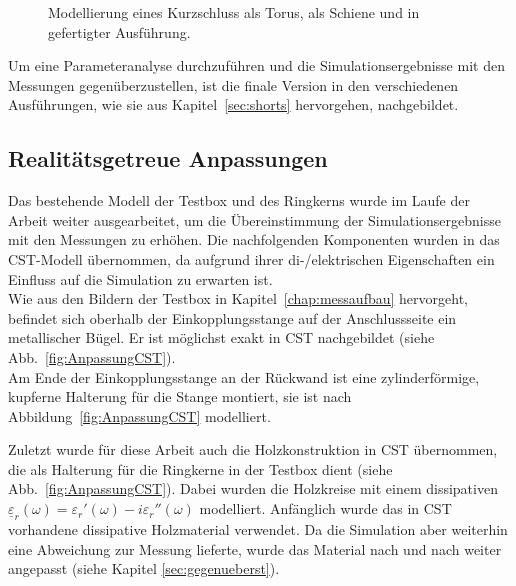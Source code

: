             \begin{figure}[htb]
                \centering
                \hspace{0.01\textwidth}
                \hspace{0.01\textwidth}
                \caption{Modellierung eines Kurzschluss \protect{} als Torus, \protect{} als Schiene und \protect{} in gefertigter Ausführung.}
                \label{fig:KSCST}
            \end{figure}
        
        Um eine Parameteranalyse durchzuführen und die Simulationsergebnisse mit den Messungen gegenüberzustellen, ist die finale Version in den verschiedenen Ausführungen, wie sie aus Kapitel~\ref{sec:shorts} hervorgehen, nachgebildet.
        
        \subsection{Realitätsgetreue Anpassungen}
        Das bestehende Modell der Testbox und des Ringkerns wurde im Laufe der Arbeit weiter ausgearbeitet, um die Übereinstimmung der Simulationsergebnisse mit den Messungen zu erhöhen. Die nachfolgenden Komponenten wurden in das CST-Modell übernommen, da aufgrund ihrer di-/elektrischen Eigenschaften ein Einfluss auf die Simulation zu erwarten ist.\\
        Wie aus den Bildern der Testbox in Kapitel~\ref{chap:messaufbau} hervorgeht, befindet sich oberhalb der Einkopplungsstange auf der Anschlussseite ein metallischer Bügel. Er ist möglichst exakt in CST nachgebildet (siehe Abb.~\ref{fig:AnpassungCST}).\\
        Am Ende der Einkopplungsstange an der Rückwand ist eine zylinderförmige, kupferne Halterung für die Stange montiert, sie ist nach Abbildung~\ref{fig:AnpassungCST} modelliert.
        \par
        Zuletzt wurde für diese Arbeit auch die Holzkonstruktion in CST übernommen, die als Halterung für die Ringkerne in der Testbox dient (siehe Abb.~\ref{fig:AnpassungCST}). Dabei wurden die Holzkreise mit einem dissipativen $\underline{\varepsilon}_r(\omega) = \varepsilon_r'(\omega)-i\varepsilon_r''(\omega)$ modelliert. Anfänglich wurde das in CST vorhandene dissipative Holzmaterial verwendet. Da die Simulation aber weiterhin eine Abweichung zur Messung lieferte, wurde das Material nach und nach weiter angepasst (siehe Kapitel \ref{sec:gegenueberst}).
        
